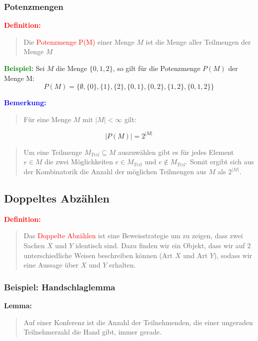 \documentclass{article}
\newcommand{\red}[1]{\textcolor{red}{#1}}
\newcommand{\blue}[1]{\textcolor{blue}{#1}}
\newcommand{\green}[1]{\textcolor{green}{#1}}
\newcommand{\dgr}[1]{\textcolor{dgr}{#1}}
\newcommand{\ex}{\green{\textbf{Beispiel: }}}
\newcommand{\de}[1]{\red{\textbf{Definition: }}\begin{quote}#1\end{quote}}
\newcommand{\an}[1]{\blue{\textbf{Bemerkung: }}\begin{quote}#1\end{quote}}
\newcommand{\lem}[1]{\dgr{\textbf{Lemma: }}\begin{quote}#1\end{quote}}
\begin{document}
\subsubsection{Potenzmengen}

\de{Die \red{Potenzmenge P(M)} einer Menge $M$ ist die Menge aller Teilmengen der Menge $M$}

\ex Sei $M$ die Menge $\{0, 1, 2\}$, so gilt für die Potenzmenge $P(M)$ der Menge M:
\begin{equation*}
    P(M) = \{\emptyset, \{0\}, \{1\}, \{2\}, \{0, 1\}, \{0, 2\}, \{1, 2\}, \{0, 1, 2\}\}
\end{equation*}

\an{Für eine Menge $M$ mit $|M| < \infty$ gilt:}
\begin{equation*}
    |P(M)| = 2^{|M|}
\end{equation*}
\begin{quote}
    Um eine Teilmenge $M_{Teil} \subseteq M$ auszuwählen gibt es für jedes Element $e \in M$ die zwei Möglichkeiten $e \in M_{Teil}$ und $e \notin M_{Teil}$.
    Somit ergibt sich aus der Kombinatorik die Anzahl der möglichen Teilmengen aus $M$ als $2^{|M|}$.
\end{quote}

\subsection{Doppeltes Abzählen}

\de{Das \red{Doppelte Abzählen} ist eine Beweisstrategie um zu zeigen, dass zwei Sachen $X$ und $Y$ identisch sind. Dazu finden wir ein Objekt, dass wir auf $2$ unterschiedliche Weisen beschreiben können (Art $X$ und Art $Y$), sodass wir eine Aussage über $X$ und $Y$ erhalten.}

\subsubsection{Beispiel: Handschlaglemma}
\lem{
    Auf einer Konferenz ist die Anzahl der Teilnehmenden, die einer ungeraden Teilnehmerzahl die Hand gibt, immer gerade.
}
\end{document}
